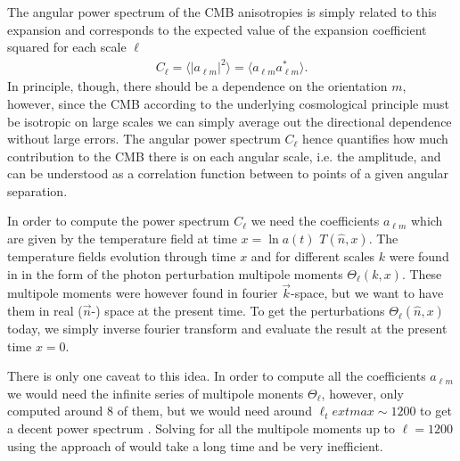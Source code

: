 \documentclass[twocolumn]{aastex62}
\begin{document}
The angular power spectrum of the CMB anisotropies is simply related to this expansion and corresponds to the expected value of the expansion coefficient squared for each scale $\ell$
\begin{align}
    C_\ell = \langle |a_{\ell m}|^2 \rangle = \langle a_{\ell m}a_{\ell m}^* \rangle.
\end{align}
In principle, though, there should be a dependence on the orientation $m$, however, since the CMB according to the underlying cosmological principle must be isotropic on large scales we can simply average out the directional dependence without large errors. The angular power spectrum $C_\ell$ hence quantifies how much contribution to the CMB there is on each angular scale, i.e. the amplitude, and can be understood as a correlation function between to points of a given angular separation. 

In order to compute the power spectrum $C_\ell$ we need the coefficients $a_{\ell m}$ which are given by the temperature field at time $x = \ln a(t)$ $T(\hat{n}, x)$. The temperature fields evolution through time $x$ and for different scales $k$ were found in \cite{stutzer:2020c} in the form of the photon perturbation multipole moments $\Theta_\ell(k, x)$. These multipole moments were however found in fourier $\vec{k}$-space, but we want to have them in real ($\vec{n}$-) space at the present time. To get the perturbations $\Theta_\ell(\hat{n}, x)$ today, we simply inverse fourier transform and evaluate the result at the present time $x = 0$. 

There is only one caveat to this idea. In order to compute all the coefficients $a_{\ell m}$ we would need the infinite series of multipole monents $\Theta_\ell$, however, \cite{stutzer:2020c} only computed around 8 of them, but we would need around $\ell_text{max} \sim 1200$ to get a decent power spectrum \citep[]{winther:2020c}. Solving for all the multipole moments up to $\ell = 1200$ using the approach of \cite{stutzer:2020c} would take a long time and be very inefficient. 
\end{document}
